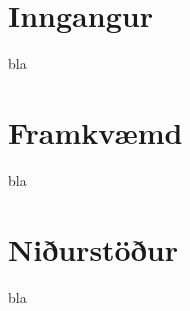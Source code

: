 \documentclass[12pt, git, final]{rureport}
\begin{document}
\maketitle  %



\section{Inngangur} %

bla
\section{Framkvæmd}
bla


\section{Niðurstöður}\label{nidurstodur}
bla
\pagebreak


\clearpage
\printbibliography
\end{document}
